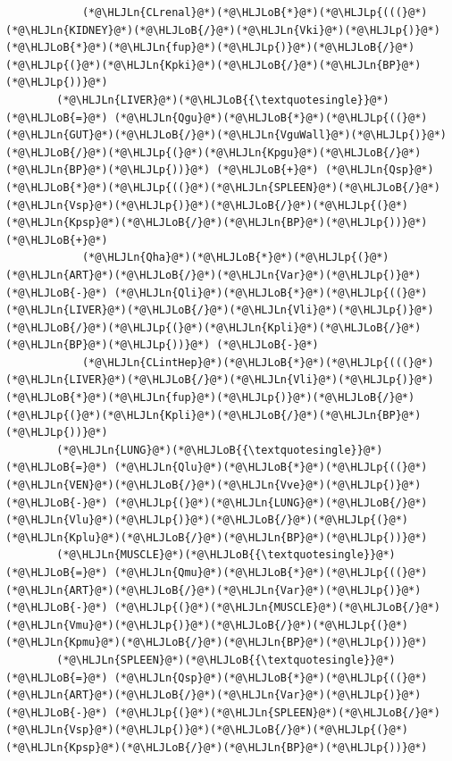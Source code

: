 \documentclass[12pt,a4paper]{article}
\newcommand{\HLJLn}[1]{#1}
\newcommand{\HLJLoB}[1]{\textcolor[RGB]{102,102,102}{\textbf{#1}}}
\newcommand{\HLJLp}[1]{#1}
\begin{document}
\begin{lstlisting}
            (*@\HLJLn{CLrenal}@*)(*@\HLJLoB{*}@*)(*@\HLJLp{(((}@*)(*@\HLJLn{KIDNEY}@*)(*@\HLJLoB{/}@*)(*@\HLJLn{Vki}@*)(*@\HLJLp{)}@*)(*@\HLJLoB{*}@*)(*@\HLJLn{fup}@*)(*@\HLJLp{)}@*)(*@\HLJLoB{/}@*)(*@\HLJLp{(}@*)(*@\HLJLn{Kpki}@*)(*@\HLJLoB{/}@*)(*@\HLJLn{BP}@*)(*@\HLJLp{))}@*)
        (*@\HLJLn{LIVER}@*)(*@\HLJLoB{{\textquotesingle}}@*) (*@\HLJLoB{=}@*) (*@\HLJLn{Qgu}@*)(*@\HLJLoB{*}@*)(*@\HLJLp{((}@*)(*@\HLJLn{GUT}@*)(*@\HLJLoB{/}@*)(*@\HLJLn{VguWall}@*)(*@\HLJLp{)}@*)(*@\HLJLoB{/}@*)(*@\HLJLp{(}@*)(*@\HLJLn{Kpgu}@*)(*@\HLJLoB{/}@*)(*@\HLJLn{BP}@*)(*@\HLJLp{))}@*) (*@\HLJLoB{+}@*) (*@\HLJLn{Qsp}@*)(*@\HLJLoB{*}@*)(*@\HLJLp{((}@*)(*@\HLJLn{SPLEEN}@*)(*@\HLJLoB{/}@*)(*@\HLJLn{Vsp}@*)(*@\HLJLp{)}@*)(*@\HLJLoB{/}@*)(*@\HLJLp{(}@*)(*@\HLJLn{Kpsp}@*)(*@\HLJLoB{/}@*)(*@\HLJLn{BP}@*)(*@\HLJLp{))}@*) (*@\HLJLoB{+}@*)
            (*@\HLJLn{Qha}@*)(*@\HLJLoB{*}@*)(*@\HLJLp{(}@*)(*@\HLJLn{ART}@*)(*@\HLJLoB{/}@*)(*@\HLJLn{Var}@*)(*@\HLJLp{)}@*) (*@\HLJLoB{-}@*) (*@\HLJLn{Qli}@*)(*@\HLJLoB{*}@*)(*@\HLJLp{((}@*)(*@\HLJLn{LIVER}@*)(*@\HLJLoB{/}@*)(*@\HLJLn{Vli}@*)(*@\HLJLp{)}@*)(*@\HLJLoB{/}@*)(*@\HLJLp{(}@*)(*@\HLJLn{Kpli}@*)(*@\HLJLoB{/}@*)(*@\HLJLn{BP}@*)(*@\HLJLp{))}@*) (*@\HLJLoB{-}@*)
            (*@\HLJLn{CLintHep}@*)(*@\HLJLoB{*}@*)(*@\HLJLp{(((}@*)(*@\HLJLn{LIVER}@*)(*@\HLJLoB{/}@*)(*@\HLJLn{Vli}@*)(*@\HLJLp{)}@*)(*@\HLJLoB{*}@*)(*@\HLJLn{fup}@*)(*@\HLJLp{)}@*)(*@\HLJLoB{/}@*)(*@\HLJLp{(}@*)(*@\HLJLn{Kpli}@*)(*@\HLJLoB{/}@*)(*@\HLJLn{BP}@*)(*@\HLJLp{))}@*)
        (*@\HLJLn{LUNG}@*)(*@\HLJLoB{{\textquotesingle}}@*) (*@\HLJLoB{=}@*) (*@\HLJLn{Qlu}@*)(*@\HLJLoB{*}@*)(*@\HLJLp{((}@*)(*@\HLJLn{VEN}@*)(*@\HLJLoB{/}@*)(*@\HLJLn{Vve}@*)(*@\HLJLp{)}@*) (*@\HLJLoB{-}@*) (*@\HLJLp{(}@*)(*@\HLJLn{LUNG}@*)(*@\HLJLoB{/}@*)(*@\HLJLn{Vlu}@*)(*@\HLJLp{)}@*)(*@\HLJLoB{/}@*)(*@\HLJLp{(}@*)(*@\HLJLn{Kplu}@*)(*@\HLJLoB{/}@*)(*@\HLJLn{BP}@*)(*@\HLJLp{))}@*)
        (*@\HLJLn{MUSCLE}@*)(*@\HLJLoB{{\textquotesingle}}@*) (*@\HLJLoB{=}@*) (*@\HLJLn{Qmu}@*)(*@\HLJLoB{*}@*)(*@\HLJLp{((}@*)(*@\HLJLn{ART}@*)(*@\HLJLoB{/}@*)(*@\HLJLn{Var}@*)(*@\HLJLp{)}@*) (*@\HLJLoB{-}@*) (*@\HLJLp{(}@*)(*@\HLJLn{MUSCLE}@*)(*@\HLJLoB{/}@*)(*@\HLJLn{Vmu}@*)(*@\HLJLp{)}@*)(*@\HLJLoB{/}@*)(*@\HLJLp{(}@*)(*@\HLJLn{Kpmu}@*)(*@\HLJLoB{/}@*)(*@\HLJLn{BP}@*)(*@\HLJLp{))}@*)
        (*@\HLJLn{SPLEEN}@*)(*@\HLJLoB{{\textquotesingle}}@*) (*@\HLJLoB{=}@*) (*@\HLJLn{Qsp}@*)(*@\HLJLoB{*}@*)(*@\HLJLp{((}@*)(*@\HLJLn{ART}@*)(*@\HLJLoB{/}@*)(*@\HLJLn{Var}@*)(*@\HLJLp{)}@*) (*@\HLJLoB{-}@*) (*@\HLJLp{(}@*)(*@\HLJLn{SPLEEN}@*)(*@\HLJLoB{/}@*)(*@\HLJLn{Vsp}@*)(*@\HLJLp{)}@*)(*@\HLJLoB{/}@*)(*@\HLJLp{(}@*)(*@\HLJLn{Kpsp}@*)(*@\HLJLoB{/}@*)(*@\HLJLn{BP}@*)(*@\HLJLp{))}@*)

\end{lstlisting}
\end{document}
